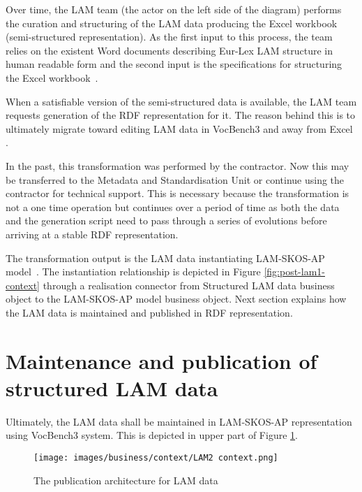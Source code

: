 	Over time, the LAM team (the actor on the left side of the diagram) performs the curation and structuring of the LAM data producing the Excel workbook (semi-structured representation). As the first input to this process, the team relies on the existent Word documents describing Eur-Lex LAM structure in human readable form \cite{lam-eurlex-spec-2017} and the second input is the specifications for structuring the Excel \mbox{workbook \citep{lam-excel-structure-2019}}. 
	
	When a satisfiable version of the semi-structured data is available, the LAM team requests generation of the RDF representation for it. The reason behind this is to ultimately migrate toward editing LAM data in VocBench3 \citep{stellato2017towards} and away from Excel \cite{excel}. 
	
	In the past, this transformation was performed by the contractor. Now this may be transferred to the Metadata and Standardisation Unit or continue using the contractor for technical support. This is necessary because the transformation is not a one time operation but continues over a period of time as both the data and the generation script need to pass through a series of evolutions before arriving at a stable RDF representation. 
	
	The transformation output is the LAM data instantiating LAM-SKOS-AP \mbox{model \citep{lam-skos-ap-2019}}. The instantiation relationship is depicted in Figure \ref{fig:post-lam1-context} through a realisation connector from Structured LAM data business object to the LAM-SKOS-AP model business object. 
	Next section explains how the LAM data is maintained and published in RDF representation. 
	
	\section{Maintenance and publication of structured LAM data}
	\label{sec:lam-maintenance-publication}
	
	Ultimately, the LAM data shall be maintained in LAM-SKOS-AP representation using VocBench3 system. This is depicted in upper part of Figure \ref{fig:lam2-context}.
		
	\begin{figure}[!h]
		\centering
		\texttt{[image: images/business/context/LAM2 context.png]}
		\caption{The publication architecture for LAM data}
		\label{fig:lam2-context}
	\end{figure} 
	
